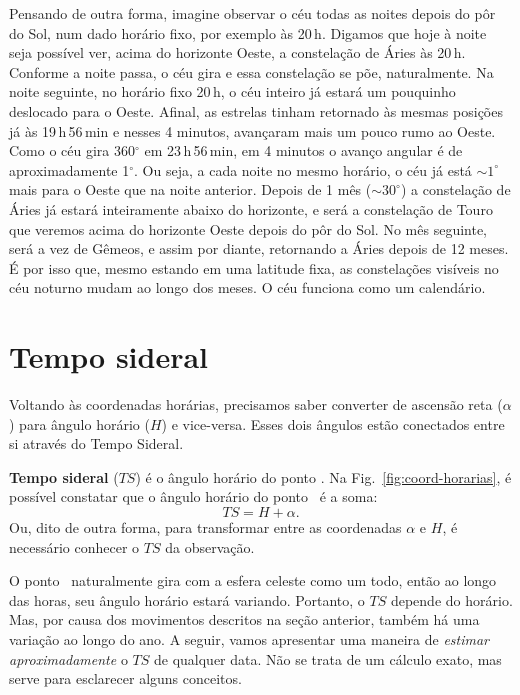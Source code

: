Pensando de outra forma, imagine observar o céu todas as noites depois do pôr do Sol, num dado horário fixo, por exemplo às 20\,h. Digamos que hoje à noite seja possível ver, acima do horizonte Oeste, a constelação de Áries às 20\,h. Conforme a noite passa, o céu gira e essa constelação se põe, naturalmente. Na noite seguinte, no horário fixo 20\,h, o céu inteiro já estará um pouquinho deslocado para o Oeste. Afinal, as estrelas tinham retornado às mesmas posições já às 19\,h\,56\,min e nesses 4 minutos, avançaram mais um pouco rumo ao Oeste. Como o céu gira 360$^{\circ}$ em 23\,h\,56\,min, em 4 minutos o avanço angular é de aproximadamente 1$^{\circ}$. Ou seja, a cada noite no mesmo horário, o céu já está ${\sim}1^{\circ}$ mais para o Oeste que na noite anterior. Depois de 1 mês (${\sim}30^{\circ}$) a constelação de Áries já estará inteiramente abaixo do horizonte, e será a constelação de Touro que veremos acima do horizonte Oeste depois do pôr do Sol. No mês seguinte, será a vez de Gêmeos, e assim por diante, retornando a Áries depois de 12 meses. É por isso que, mesmo estando em uma latitude fixa, as constelações visíveis no céu noturno mudam ao longo dos meses. O céu funciona como um calendário.

\section{Tempo sideral}
\label{sec:ts}

Voltando às coordenadas horárias, precisamos saber converter de ascensão reta ($\alpha$) para ângulo horário ($H$) e vice-versa. Esses dois ângulos estão conectados entre si através do Tempo Sideral.

\textbf{Tempo sideral} ($TS$) é o ângulo horário do ponto \Aries. Na Fig.~\ref{fig:coord-horarias}, é possível constatar que o ângulo horário do ponto \Aries\ é a soma:
%
\begin{equation}
TS = H + \alpha.
\end{equation}
%
Ou, dito de outra forma, para transformar entre as coordenadas $\alpha$ e $H$, é necessário conhecer o $TS$ da observação.

O ponto \Aries\ naturalmente gira com a esfera celeste como um todo, então ao longo das horas, seu ângulo horário estará variando. Portanto, o $TS$ depende do horário. Mas, por causa dos movimentos descritos na seção anterior, também há uma variação ao longo do ano. A seguir, vamos apresentar uma maneira de \textit{estimar aproximadamente} o $TS$ de qualquer data. Não se trata de um cálculo exato, mas serve para esclarecer alguns conceitos.

